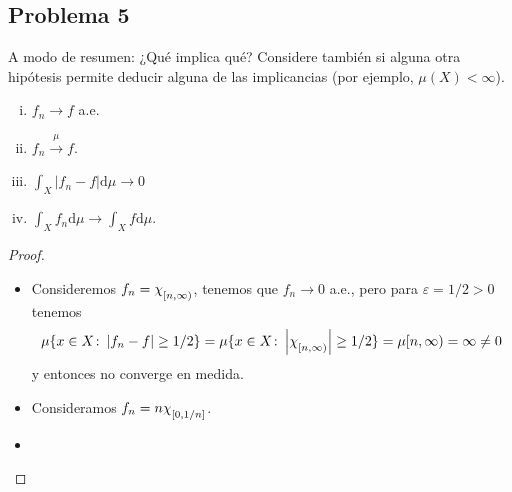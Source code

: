 \documentclass{article}
\theoremstyle{definition}
\theoremstyle{remark}
\numberwithin{equation}{section}
\renewcommand{\d}{\mathrm{d}}
\newcommand{\e}{\varepsilon}
\newcommand{\oo}{\infty}
\newcommand{\abs}[1]{\left| #1 \right|}
\newcommand{\Chi}[1]{\chi_{\raisebox{-.5ex}{$\scriptstyle #1$}}}
\newcommand{\ds}{\displaystyle}
\begin{document}
\newpage
\subsection{Problema 5}

A modo de resumen: ¿Qué implica qué? Considere también si alguna otra hipótesis permite deducir alguna de las implicancias (por ejemplo, $\mu(X) < \oo$).

\begin{enumerate}[(i)]
  \item $f_n \to f$ a.e.
  \item $f_n \xrightarrow{\mu} f$.
  \item $\ds \int_X \abs{f_n - f} \d\mu \to 0$
  \item $\ds \int_X f_n \d\mu \to \int_X f \d\mu$.
\end{enumerate}

\begin{proof}
  \ \begin{itemize}
    \item {} Consideremos $f_n = \Chi{[n,\oo)}$, tenemos que $f_n \to 0$ a.e., pero para $\e = 1/2 > 0$ tenemos 
    \[ \mu\{x \in X \colon \abs{f_n - f} \geq 1/2\} = \mu\{x \in X \colon \abs{\Chi{[n,\oo)}} \geq 1/2\} = \mu[n,\oo) = \oo \neq 0 \]
    y entonces no converge en medida.
    \item {} Consideramos $f_n = n \Chi{[0,1/n]}$.
    \item 
  \end{itemize}
\end{proof}
\end{document}
